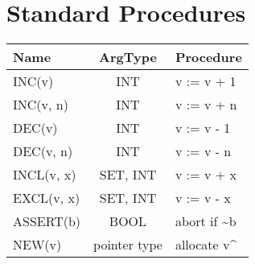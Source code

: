 \section{Standard Procedures}
\begin{table}[h!]
  \centering
  \begin{tabular}{l c l}
    Name      & ArgType  & Procedure \\\hline
    INC(v)    & INT      & v := v + 1 \\
    INC(v, n) & INT      & v := v + n \\
    DEC(v)    & INT      & v := v - 1 \\
    DEC(v, n) & INT      & v := v - n \\
    INCL(v, x)& SET, INT & v := v + {x} \\
    EXCL(v, x)& SET, INT & v := v - {x} \\
    ASSERT(b) & BOOL     & abort if \~{}b \\
    NEW(v)    & pointer type & allocate v\^{}
  \end{tabular}
\end{table}
